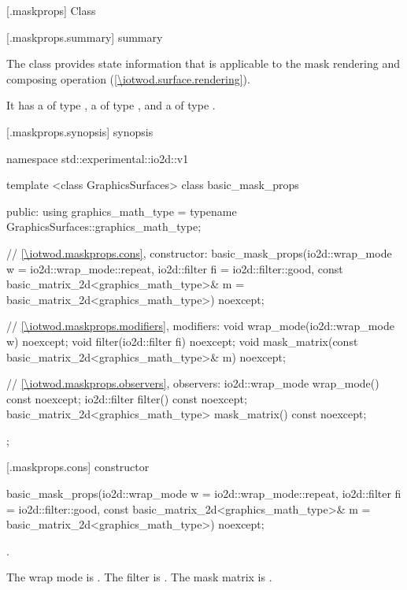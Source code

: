 
 [\iotwod.maskprops] {Class }

 [\iotwod.maskprops.summary] { summary}

\pnum
The  class provides state information that is applicable to the mask rendering and composing operation (\ref{\iotwod.surface.rendering}).

\pnum
It has a  of type , a  of type , and a  of type .

 [\iotwod.maskprops.synopsis] { synopsis}

\begin{codeblock}
namespace std::experimental::io2d::v1 {
  template <class GraphicsSurfaces>
  class basic_mask_props {
    public:
    using graphics_math_type = typename GraphicsSurfaces::graphics_math_type;

    // \ref{\iotwod.maskprops.cons}, constructor:
    basic_mask_props(io2d::wrap_mode w = io2d::wrap_mode::repeat,
      io2d::filter fi = io2d::filter::good,
      const basic_matrix_2d<graphics_math_type>& m = basic_matrix_2d<graphics_math_type>{})
      noexcept;

    // \ref{\iotwod.maskprops.modifiers}, modifiers:
    void wrap_mode(io2d::wrap_mode w) noexcept;
    void filter(io2d::filter fi) noexcept;
    void mask_matrix(const basic_matrix_2d<graphics_math_type>& m) noexcept;

    // \ref{\iotwod.maskprops.observers}, observers:
    io2d::wrap_mode wrap_mode() const noexcept;
    io2d::filter filter() const noexcept;
    basic_matrix_2d<graphics_math_type> mask_matrix() const noexcept;
  };
}
\end{codeblock}

 [\iotwod.maskprops.cons] { constructor}

%
\begin{itemdecl}
basic_mask_props(io2d::wrap_mode w = io2d::wrap_mode::repeat,
  io2d::filter fi = io2d::filter::good,
  const basic_matrix_2d<graphics_math_type>& m = basic_matrix_2d<graphics_math_type>{}) noexcept;
\end{itemdecl}
\begin{itemdescr}
\requires
{}.

\pnum
\effects
The wrap mode is . The filter is . The mask matrix is .
\end{itemdescr}

